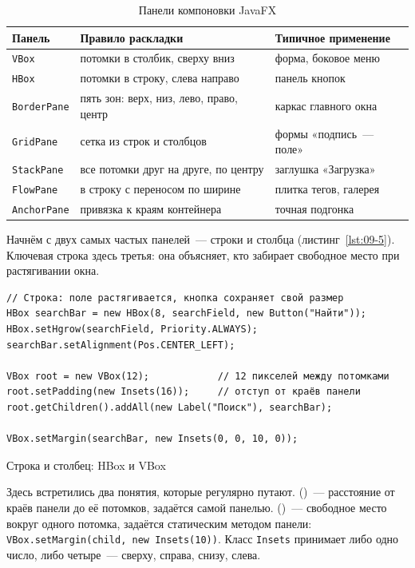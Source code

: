 \begin{table}[htbp]
\caption{Панели компоновки JavaFX}
\label{tab:09-4}
\centering
\begin{tabular}{L{2.6cm}L{6.4cm}L{6.0cm}}
\toprule
Панель & Правило раскладки & Типичное применение \\
\midrule
\texttt{VBox} & потомки в столбик, сверху вниз & форма, боковое меню \\
\texttt{HBox} & потомки в строку, слева направо & панель кнопок \\
\texttt{BorderPane} & пять зон: верх, низ, лево, право, центр & каркас главного окна \\
\texttt{GridPane} & сетка из строк и столбцов & формы «подпись~--- поле» \\
\texttt{StackPane} & все потомки друг на друге, по центру & заглушка «Загрузка» \\
\texttt{FlowPane} & в строку с переносом по ширине & плитка тегов, галерея \\
\texttt{AnchorPane} & привязка к краям контейнера & точная подгонка \\
\bottomrule
\end{tabular}
\end{table}

Начнём с двух самых частых панелей~--- строки и столбца
(листинг~\ref{lst:09-5}). Ключевая строка здесь третья: она объясняет, кто
забирает свободное место при растягивании окна.

\begin{listing}[H]
\begin{verbatim}
// Строка: поле растягивается, кнопка сохраняет свой размер
HBox searchBar = new HBox(8, searchField, new Button("Найти"));
HBox.setHgrow(searchField, Priority.ALWAYS);
searchBar.setAlignment(Pos.CENTER_LEFT);

VBox root = new VBox(12);            // 12 пикселей между потомками
root.setPadding(new Insets(16));     // отступ от краёв панели
root.getChildren().addAll(new Label("Поиск"), searchBar);

VBox.setMargin(searchBar, new Insets(0, 0, 10, 0));
\end{verbatim}
\caption{Строка и столбец: HBox и VBox}
\label{lst:09-5}
\end{listing}

Здесь встретились два понятия, которые регулярно путают.
 ()~--- расстояние от краёв панели до её
потомков, задаётся самой панелью.  ()~---
свободное место вокруг одного потомка, задаётся статическим методом панели:
\texttt{VBox.setMargin(child, new Insets(10))}. Класс \texttt{Insets} принимает
либо одно число, либо четыре~--- сверху, справа, снизу, слева.


